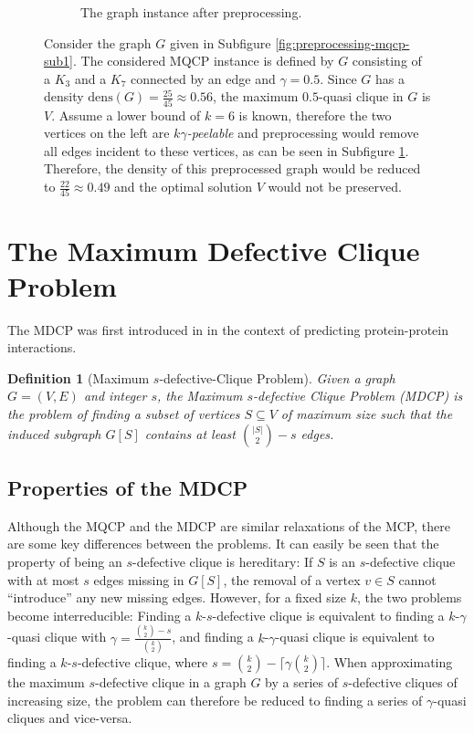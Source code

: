 \documentclass[draft,final]{vutinfth} %
\newtheorem{definition}{Definition}[section]
\begin{document}
\begin{figure}
\begin{subfigure}{.5\textwidth}
      \caption{The graph instance after preprocessing.}
      \label{fig:preprocessing-mqcp-sub2}
    \end{subfigure}
    \caption{Consider the graph $G$ given in Subfigure \ref{fig:preprocessing-mqcp-sub1}. The considered MQCP instance is defined by $G$ consisting of a $K_3$ and a $K_7$ connected by an edge and $\gamma=0.5$. Since $G$ has a density $\mathrm{dens}(G) = \frac{25}{45} \approx 0.56$, the maximum $0.5$-quasi clique in $G$ is $V$. Assume a lower bound of $k=6$ is known, therefore the two vertices on the left are $k\gamma$\emph{-peelable} and preprocessing would remove all edges incident to these vertices, as can be seen in Subfigure \ref{fig:preprocessing-mqcp-sub2}. Therefore, the density of this preprocessed graph would be reduced to $\frac{22}{45} \approx 0.49$ and the optimal solution $V$ would not be preserved.}
    \label{fig:preprocessing-mqcp-counterexample}
\end{figure}

\section{The Maximum Defective Clique Problem}\label{sec:mdcp}

The MDCP was first introduced in \cite{Yu2006} in the context of predicting protein-protein interactions. 

\begin{definition}[Maximum $s$-defective-Clique Problem]
	\label{def:mdcp}
	Given a graph \\ 
    $G = (V,E)$ and integer $s$, the Maximum $s$-defective Clique Problem (MDCP) is the problem of finding a subset of vertices $S \subseteq V$ of maximum size 
	such that the induced subgraph $G[S]$ contains at least $\binom{|S|}{2} - s$ edges. 
\end{definition}

\subsection{Properties of the MDCP}

Although the MQCP and the MDCP are similar relaxations of the MCP, there are some key differences between the problems. It can easily be seen that the property of being an $s$-defective clique is hereditary: If $S$ is an $s$-defective clique with at most $s$ edges missing in $G[S]$, the removal of a vertex $v \in S$ cannot ``introduce'' any new missing edges.  
However, for a fixed size $k$, the two problems become interreducible: 
Finding a $k$-$s$-defective clique is equivalent to finding a $k$-$\gamma$-quasi clique with $\gamma = \frac{\binom{k}{2} - s}{\binom{k}{2}} $, and finding a $k$-$\gamma$-quasi clique is equivalent to finding a $k$-$s$-defective clique, where $s = \binom{k}{2} - \lceil \gamma \binom{k}{2} \rceil$. 
When approximating the maximum $s$-defective clique in a graph $G$ by a series of $s$-defective cliques of increasing size, the problem can therefore be reduced to finding a series of $\gamma$-quasi cliques and vice-versa.
\end{document}
